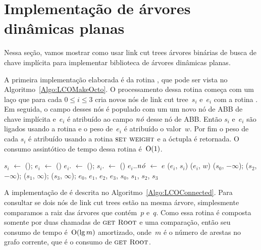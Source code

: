 \section{Implementação de árvores dinâmicas planas}
\label{sec:implementacao-ADP}

Nessa seção, vamos mostrar como usar link cut trees árvores binárias de busca de chave implícita para implementar biblioteca de árvores dinâmicas planas.

A primeira implementação elaborada é da rotina \LCOMakeOcto{}, que pode ser vista no Algoritmo~\ref{Algo:LCOMakeOcto}.
O processamento dessa rotina começa com um laço que para cada $0\leq i\leq 3$ cria novos nós de link cut tree~$s_i$ e~$e_i$ com a rotina \linkcutCreate{}.
Em seguida, o campo  desses nós é populado com um um novo nó de ABB de chave implícita e~$e_i$ é atribuído ao campo $\mathit{n\acute{o}}$ desse nó de ABB.
Então $s_i$ e~$e_i$ são ligados usando a rotina \linkcutAddEdge{} e o peso de~$e_i$ é atribuído o valor~$w$.
Por fim o peso de cada $s_i$ é atribuído usando a rotina $\text{\scshape \text{\scshape set weight}}$ e a óctupla é retornada.
O consumo assintótico de tempo dessa rotina é~$\mathrm{O}(1)$.

\begin{algorithm}[htb]
\caption{\LCOMakeOcto($e$, $w$)}
\label{Algo:LCOMakeOcto}
\begin{algorithmic}[1]
  \State $s_i$ $\gets$ \linkcutCreate(); $e_i$ $\gets$ \linkcutCreate()
  \State $e_i$. $\gets$ \treapCreate(); $s_i$. $\gets$ \treapCreate()
  \State $e_i$..$\mathit{n\acute{o}}$ $\gets$ $e$
  \State \linkcutAddEdge($e_i$, $s_i$)
  \State \linkcutWeight($e_i$, $w$)
\EndFor
\State \linkcutWeight($s_0$, $-\infty$); \linkcutWeight($s_2$, $-\infty$);
\State \linkcutWeight($s_1$, $\infty$); \linkcutWeight($s_3$, $\infty$);
\State \Return $e_0$, $e_1$, $e_2$, $e_3$, $s_0$, $s_1$, $s_2$, $s_3$
\end{algorithmic}
\end{algorithm}

\TODO{\LCODestroyOcto}


A implementação de \LCOConnected{} é descrita no Algoritmo~\ref{Algo:LCOConnected}. Para consultar se dois nós de link cut trees estão na mesma árvore, simplesmente comparamos a raiz das árvores que contém~$p$ e~$q$.
Como essa rotina é composta somente por duas chamadas de $\text{\scshape \text{\scshape get Root}}$ e uma comparação, então seu consumo de tempo é~$\mathrm{O}(\lg m)$ amortizado, onde~$m$ é o número de arestas no grafo corrente, que é o consumo de $\text{\scshape \text{\scshape get Root}}$.


